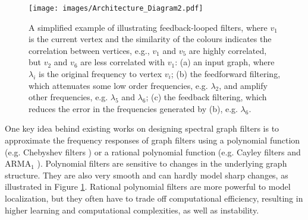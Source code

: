 \documentclass{article}
\begin{document}
\begin{figure}[t!]
    \centering
    \texttt{[image: images/Architecture\_Diagram2.pdf]}
    \caption{A simplified example of illustrating feedback-looped filters, where $v_1$ is the current vertex and the similarity of the colours indicates the correlation between vertices, e.g., $v_1$ and $v_5$ are highly correlated, but $v_2$ and $v_6$ are less correlated with $v_1$: (a) an input graph, where $\lambda_i$ is the original frequency to vertex $v_i$; (b) the feedforward filtering, which attenuates some low order frequencies, e.g. $\lambda_2$, and amplify other frequencies, e.g. $\lambda_{5}$ and $\lambda_{6}$; (c) the feedback filtering, which reduces the error in the frequencies generated by (b), e.g. $\lambda_{6}$. \label{fig:firstModel}}\vspace{-0.2cm}
\end{figure}
One key idea behind existing works on designing spectral graph filters is to approximate the frequency responses of graph filters using a polynomial function (e.g. Chebyshev filters \cite{defferrard2016convolutional}) or a rational polynomial function (e.g. Cayley filters \cite{levie2017cayleynets} and ARMA$_1$ \cite{bianchi2019graph}). Polynomial filters are sensitive to changes in the underlying graph structure. They are also very smooth and can hardly model sharp changes, as illustrated in Figure \ref{fig:firstModel}. Rational polynomial filters are more powerful to model localization, but they often have to trade off computational efficiency, resulting in higher learning and computational complexities, as well as instability. 
 
\end{document}
